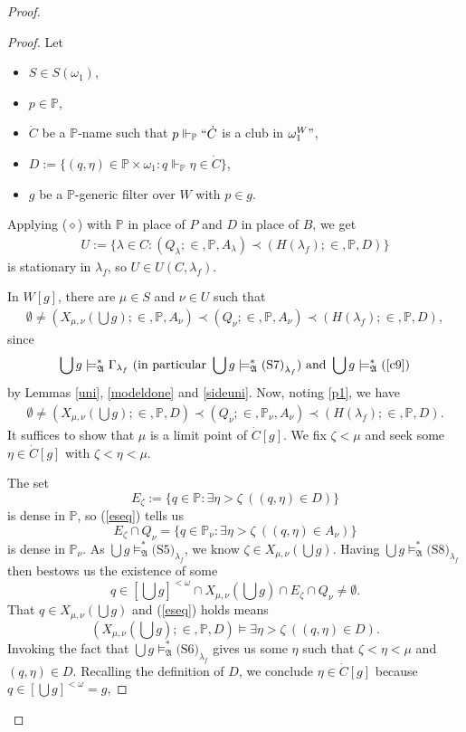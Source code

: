 \documentclass[12pt, twoside]{memoir}
\numberwithin{equation}{section}
\theoremstyle{definition}
\theoremstyle{remark}
\theoremstyle{definition}
\theoremstyle{definition}
\theoremstyle{definition}
\theoremstyle{remark}
\begin{document}
\begin{proof}
\begin{proof}
Let 
\begin{itemize}
    \item $S \in S(\omega_1)$,
    \item $p \in \mathbb{P}$,
    \item $\dot{C}$ be a $\mathbb{P}$-name such that $p \Vdash_{\mathbb{P}} ``\dot{C}$ is a club in $\omega_1^W"$,
    \item $D := \{(q, \eta) \in \mathbb{P} \times \omega_1 : q \Vdash_{\mathbb{P}} \eta \in \dot{C}\}$,
    \item $g$ be a $\mathbb{P}$-generic filter over $W$ with $p \in g$.
\end{itemize}
Applying ($\diamond$) with $\mathbb{P}$ in place of $P$ and $D$ in place of $B$, we get
\begin{align*}
    U := \{\lambda \in C : (Q_{\lambda}; \in, \mathbb{P}, A_{\lambda}) \prec (H(\lambda_f); \in, \mathbb{P}, D)\}
\end{align*}
is stationary in $\lambda_f$, so $U \in U(C, \lambda_f)$.

In $W[g]$, there are $\mu \in S$ and $\nu \in U$ such that 
\begin{align*}
    \emptyset \neq (X_{\mu, \nu}(\bigcup g); \in, \mathbb{P}, A_{\nu}) \prec (Q_{\nu}; \in, \mathbb{P}, A_{\nu}) \prec (H(\lambda_f); \in, \mathbb{P}, D),
\end{align*}
since $$\bigcup g \models^*_{\mathfrak{A}} \Gamma_{\lambda_f} \text{ (in particular } \bigcup g \models^*_{\mathfrak{A}} \text{(S7)}_{\lambda_f} \text{) and } \bigcup g \models^*_{\mathfrak{A}} \text{(}\ref{c9}\text{)}$$ by Lemmas \ref{uni}, \ref{modeldone} and \ref{sideuni}. Now, noting \ref{p1}, we have 
\begin{align}\label{eseq}
    \emptyset \neq (X_{\mu, \nu}(\bigcup g); \in, \mathbb{P}, D) \prec (Q_{\nu}; \in, \mathbb{P}_{\nu}, A_{\nu}) \prec (H(\lambda_f); \in, \mathbb{P}, D).
\end{align}
It suffices to show that $\mu$ is a limit point of $\dot{C}[g]$. We fix $\zeta < \mu$ and seek some $\eta \in \dot{C}[g]$ with $\zeta < \eta < \mu$. 

The set $$E_{\zeta} := \{q \in \mathbb{P} : \exists \eta > \zeta \ ((q, \eta) \in D)\}$$ is dense in $\mathbb{P}$, so (\ref{eseq}) tells us $$E_{\zeta} \cap Q_{\nu} = \{q \in \mathbb{P}_{\nu} : \exists \eta > \zeta \ ((q, \eta) \in A_{\nu})\}$$ is dense in $\mathbb{P}_{\nu}$. As $\bigcup g \models^*_{\mathfrak{A}} \text{(S5)}_{\lambda_f}$, we know $\zeta \in X_{\mu, \nu}(\bigcup g)$. Having $\bigcup g \models^*_{\mathfrak{A}} \text{(S8)}_{\lambda_f}$ then bestows us the existence of some $$q \in [\bigcup g]^{< \omega} \cap X_{\mu, \nu}(\bigcup g) \cap E_{\zeta} \cap Q_{\nu} \neq \emptyset.$$ That $q \in X_{\mu, \nu}(\bigcup g)$ and (\ref{eseq}) holds means $$(X_{\mu, \nu}(\bigcup g); \in, \mathbb{P}, D) \models \exists \eta > \zeta \ ((q, \eta) \in D).$$ Invoking the fact that $\bigcup g \models^*_{\mathfrak{A}} \text{(S6)}_{\lambda_f}$ gives us some $\eta$ such that $\zeta < \eta < \mu$ and $(q, \eta) \in D$. Recalling the definition of $D$, we conclude $\eta \in \dot{C}[g]$ because $q \in [\bigcup g]^{< \omega} = g$, 
\end{proof}


\end{proof}
\end{document}
